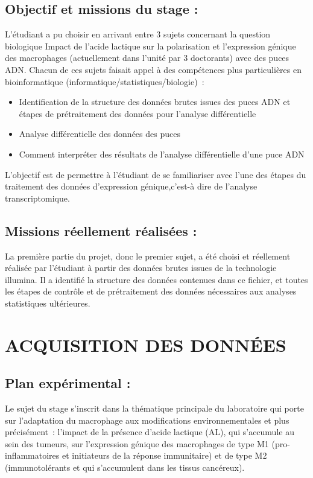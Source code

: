 \documentclass[a4paper,10pt]{article}
\begin{document}
\subsection{Objectif et missions du stage :}
L’étudiant a pu choisir en arrivant entre 3 sujets concernant la question biologique \textgravedbl Impact de l’acide lactique sur la polarisation et l’expression génique des macrophages \textacutedbl (actuellement dans l’unité par 3 doctorants)  avec des puces ADN. Chacun de ces sujets faisait appel à des compétences plus particulières en bioinformatique (informatique/statistiques/biologie) :
\begin{itemize}
 \item Identification de la structure des données brutes issues des puces ADN et étapes de prétraitement des données pour l’analyse différentielle 
\item Analyse différentielle des données des puces 
\item Comment interpréter des résultats de l’analyse différentielle d’une puce ADN 
\end{itemize}
L’objectif est de permettre à l’étudiant de se familiariser avec l’une des étapes du traitement des données d’expression génique,c'est-à dire de l'analyse transcriptomique.
\subsection{Missions réellement réalisées :}
La première partie du projet, donc le premier sujet, a été choisi et réellement réalisée par l’étudiant à partir des données brutes issues de la technologie illumina. 
Il a identifié la structure des données contenues dans ce fichier, et toutes les étapes de contrôle et de prétraitement des données nécessaires aux analyses statistiques ultérieures.
\section{ACQUISITION DES DONN\'{E}ES }

\subsection{ Plan expérimental :}
Le sujet du stage s’inscrit dans la thématique principale du laboratoire qui porte sur l’adaptation du macrophage aux modifications environnementales et plus précisément : l’impact de la présence d’acide lactique (AL), qui s’accumule au sein des tumeurs, sur l’expression génique des macrophages de type M1 (pro-inflammatoires et initiateurs de la réponse immunitaire) et de type M2 (immunotolérants et qui s’accumulent dans les tissus cancéreux).
\end{document}
